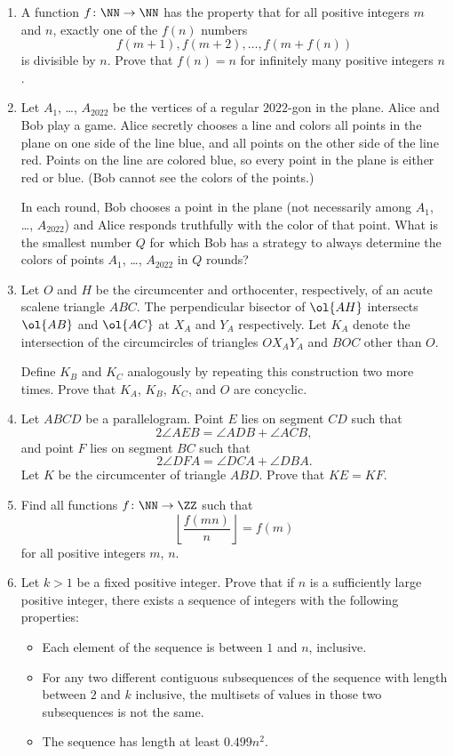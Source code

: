 \documentclass[11pt]{scrartcl}
\begin{document}
\begin{enumerate}[\bfseries 1.]
\item %
A function $f \colon \NN \to \NN$ has the property that
for all positive integers $m$ and $n$, exactly one of the $f(n)$ numbers
\[ f(m+1), f(m+2), \dots, f(m+f(n)) \]
is divisible by $n$.
Prove that $f(n)=n$ for infinitely many positive integers $n$.

\item %
Let $A_1$, \dots, $A_{2022}$ be the vertices of a regular $2022$-gon in the plane.
Alice and Bob play a game.
Alice secretly chooses a line and colors all points in the plane
on one side of the line blue, and all points on the other side of the line red.
Points on the line are colored blue,
so every point in the plane is either red or blue.
(Bob cannot see the colors of the points.)

In each round, Bob chooses a point in the
plane (not necessarily among $A_1$, \dots, $A_{2022}$)
and Alice responds truthfully with the color of that point.
What is the smallest number $Q$ for which Bob has a strategy to
always determine the colors of points $A_1$, \dots, $A_{2022}$ in $Q$ rounds?

\item %
Let $O$ and $H$ be the circumcenter and orthocenter,
respectively, of an acute scalene triangle $ABC$.
The perpendicular bisector of $\ol{AH}$ intersects
$\ol{AB}$ and $\ol{AC}$ at $X_A$ and $Y_A$ respectively.
Let $K_A$ denote the intersection of
the circumcircles of triangles $OX_AY_A$ and $BOC$ other than $O$.

Define $K_B$ and $K_C$ analogously by repeating this
construction two more times.
Prove that $K_A$, $K_B$, $K_C$, and $O$ are concyclic.

\item %
Let $ABCD$ be a parallelogram.
Point $E$ lies on segment $CD$ such that
\[ 2\angle AEB = \angle ADB+\angle ACB, \]
and point $F$ lies on segment $BC$ such that
\[ 2\angle DFA = \angle DCA + \angle DBA. \]
Let $K$ be the circumcenter of triangle $ABD$. Prove that $KE=KF$.

\item %
Find all functions $f \colon \NN \to \ZZ$ such that
\[ \left\lfloor \frac{f(mn)}{n} \right\rfloor = f(m) \]
for all positive integers $m$, $n$.

\item %
Let $k > 1$ be a fixed positive integer.
Prove that if $n$ is a sufficiently large positive integer,
there exists a sequence of integers with the following properties:
\begin{itemize}
  \item Each element of the sequence is between $1$ and $n$, inclusive.
  \item For any two different contiguous subsequences of the sequence with
    length between $2$ and $k$ inclusive,
    the multisets of values in those two subsequences is not the same.
  \item The sequence has length at least $0.499n^2$.
\end{itemize}

\end{enumerate}
\pagebreak
\end{document}
